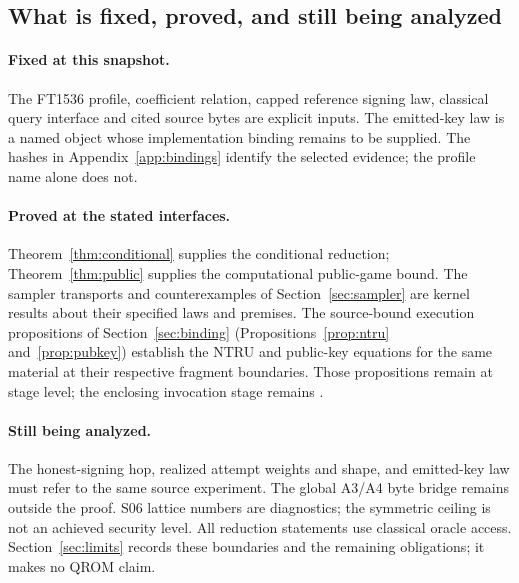 \subsection{What is fixed, proved, and still being analyzed}\label{sec:fixed}
\paragraph{Fixed at this snapshot.}
The FT1536 profile, coefficient relation, capped reference signing law,
classical query interface and cited source bytes are explicit inputs.
The emitted-key law is a named object whose implementation binding
remains to be supplied. The hashes in Appendix~\ref{app:bindings}
identify the selected evidence; the profile name alone does not.

\paragraph{Proved at the stated interfaces.}
Theorem~\ref{thm:conditional} supplies the conditional reduction;
Theorem~\ref{thm:public} supplies the computational public-game bound.
The sampler transports and counterexamples of Section~\ref{sec:sampler}
are kernel results about their specified laws and premises. The
source-bound execution propositions of Section~\ref{sec:binding}
(Propositions~\ref{prop:ntru} and~\ref{prop:pubkey}) establish the
NTRU and public-key equations for the same material at their respective
fragment boundaries. Those propositions remain \NOTREVIEWED{} at stage
level; the enclosing invocation stage remains \INFLIGHT.

\paragraph{Still being analyzed.}
The honest-signing hop, realized attempt weights and shape, and
emitted-key law must refer to the same source experiment. The global
A3/A4 byte bridge remains outside the proof. S06 lattice numbers are
\UNCERTIFIED{} diagnostics; the symmetric ceiling is not an achieved
security level. All reduction statements use classical oracle access.
Section~\ref{sec:limits} records these boundaries and the remaining
obligations; it makes no QROM claim.

